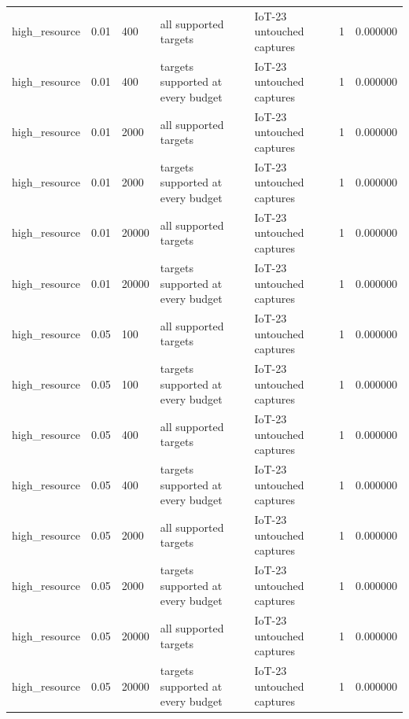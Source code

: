 \begin{tabular}{lllllll}
high\_resource & 0.01 & 400 & all supported targets & IoT-23 untouched captures & 1 & 0.000000 \\
high\_resource & 0.01 & 400 & targets supported at every budget & IoT-23 untouched captures & 1 & 0.000000 \\
high\_resource & 0.01 & 2000 & all supported targets & IoT-23 untouched captures & 1 & 0.000000 \\
high\_resource & 0.01 & 2000 & targets supported at every budget & IoT-23 untouched captures & 1 & 0.000000 \\
high\_resource & 0.01 & 20000 & all supported targets & IoT-23 untouched captures & 1 & 0.000000 \\
high\_resource & 0.01 & 20000 & targets supported at every budget & IoT-23 untouched captures & 1 & 0.000000 \\
high\_resource & 0.05 & 100 & all supported targets & IoT-23 untouched captures & 1 & 0.000000 \\
high\_resource & 0.05 & 100 & targets supported at every budget & IoT-23 untouched captures & 1 & 0.000000 \\
high\_resource & 0.05 & 400 & all supported targets & IoT-23 untouched captures & 1 & 0.000000 \\
high\_resource & 0.05 & 400 & targets supported at every budget & IoT-23 untouched captures & 1 & 0.000000 \\
high\_resource & 0.05 & 2000 & all supported targets & IoT-23 untouched captures & 1 & 0.000000 \\
high\_resource & 0.05 & 2000 & targets supported at every budget & IoT-23 untouched captures & 1 & 0.000000 \\
high\_resource & 0.05 & 20000 & all supported targets & IoT-23 untouched captures & 1 & 0.000000 \\
high\_resource & 0.05 & 20000 & targets supported at every budget & IoT-23 untouched captures & 1 & 0.000000 \\
\bottomrule
\end{tabular}
